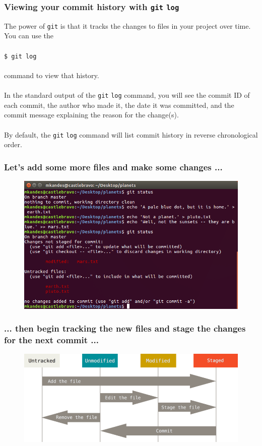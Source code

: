 \documentclass{beamer}
\begin{document}
\begin{frame}
   \frametitle{Viewing your commit history with \texttt{git} \texttt{log}}
   The power of \texttt{git} is that it tracks the changes to files in 
   your project over time. You can use the
   \\ \ \\
   \texttt{\hspace{1.0em}\$ git log}
   \\ \ \\
   command to view that history.
   \\ \ \\
   In the standard output of the \texttt{git} \texttt{log} command, you
   will see the commit ID of each commit, the author who made it, the 
   date it was committed, and the commit message explaining the reason 
   for the change(s).
   \\ \ \\
   By default, the \texttt{git} \texttt{log} command will list commit 
   history in reverse chronological order. 
\end{frame}

\begin{frame}
   \frametitle{Let's add some more files and make some changes ...}
   \begin{figure}[htbp]
      \includegraphics[width=1.0\textwidth]{images/git-adding-more-files-and-some-changes.png}
   \end{figure}
\end{frame}

\begin{frame}
   \frametitle{... then begin tracking the new files and stage the changes for the next commit ...}
   \begin{figure}[htbp]
      \includegraphics[width=1.0\textwidth]{images/git-file-lifecycle.png}
   \end{figure}
\end{frame}
\end{document}
